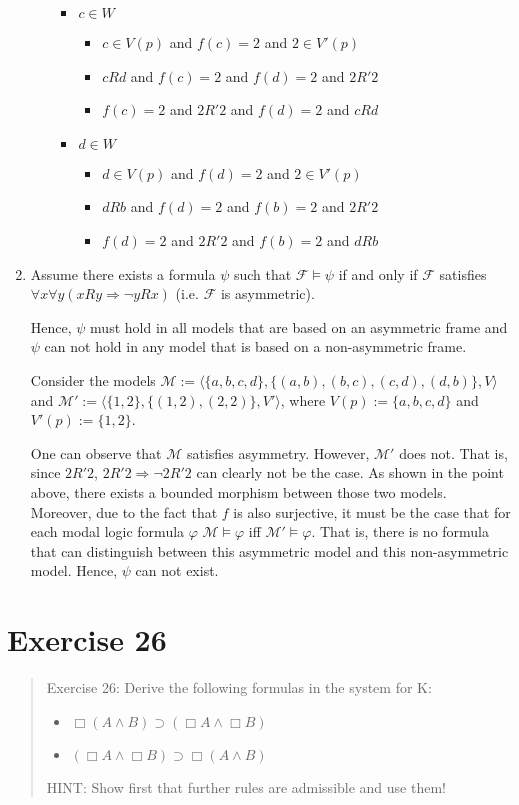 \documentclass[11pt,a4paper]{article}
\newcommand{\lto}{\supset}
\newcommand{\all}{\Box}
\newcommand{\sto}{\Rightarrow}
\begin{document}
\begin{enumerate}
\begin{itemize}
\begin{itemize}
\item $c \in W$
\begin{itemize}
\item $c \in V(p)$ and $f(c)=2$ and $2  \in V'(p)$
\item $cRd$ and $f(c)=2$ and $f(d)=2$ and $2R'2$
\item $f(c)=2$ and $2R'2$ and $f(d)=2$ and $cRd$
\end{itemize}


\item $d \in W$
\begin{itemize}
\item $d \in V(p)$ and $f(d)=2$ and $2  \in V'(p)$
\item $dRb$ and $f(d)=2$ and $f(b)=2$ and $2R'2$
\item $f(d)=2$ and $2R'2$ and $f(b)=2$ and $dRb$
\end{itemize}
\end{itemize}
\end{itemize}


\item
Assume there exists a formula $\psi$ such that $\mathcal{F} \models \psi$ if and only if $\mathcal{F}$ satisfies $\forall x \forall y (xRy \sto \neg y R x)$ (i.e. $\mathcal{F}$ is asymmetric).

Hence, $\psi$ must hold in all models that are based on an asymmetric frame and $\psi$ can not hold in any model that is based on a non-asymmetric frame.

Consider the models 
$\mathcal{M}:= \langle \{a,b,c,d\}, \{(a,b),(b,c),(c,d),(d,b)\},V\rangle$ and $\mathcal{M}':= \langle \{1,2\}, \{(1,2),(2,2)\},V'\rangle$, where $V(p):=\{a,b,c,d\}$ and $V'(p):=\{1,2\}$.

One can observe that $\mathcal{M}$ satisfies asymmetry. However, $\mathcal{M}'$ does not. That is, since $2R'2$, $2R'2 \sto \neg 2R'2$ can clearly not be the case.
As shown in the point above, there exists a bounded morphism between those two models. Moreover, due to the fact that $f$ is also surjective, it must be the case that for each modal logic formula $\varphi$  $\mathcal{M}\models \varphi$ iff $\mathcal{M}' \models \varphi$. That is, there is no formula that can distinguish between this asymmetric model and this non-asymmetric model. Hence, $\psi$ can not exist.

\end{enumerate}



\section*{Exercise 26}
\begin{quote}
Exercise 26:
Derive the following formulas in the system for K:
\begin{itemize}
\item $\all (A \land B) \lto (\all A \land \all B)$
\item $(\all A \land \all B) \lto \all (A \land B)  $
\end{itemize}
HINT: Show first that further rules are admissible and use them!
\end{quote}
\end{document}
